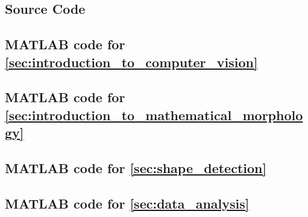 \begin{appendices}
\section{Source Code}
\subsection{MATLAB code for \autoref{sec:introduction_to_computer_vision}}
\label{sec:appendix_a1}



\newpage
\subsection{MATLAB code for \autoref{sec:introduction_to_mathematical_morphology}}
\label{sec:appendix_a2}



\newpage
\subsection{MATLAB code for \autoref{sec:shape_detection}}
\label{sec:appendix_a3}



\newpage
\subsection{MATLAB code for \autoref{sec:data_analysis}}
\label{sec:appendix_a4}


\newpage
{}











\end{appendices}


